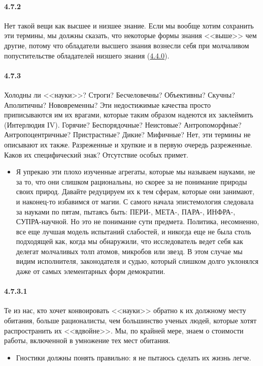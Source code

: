 \paragraph{4.7.2}\hypertarget{par:4.7.2}{} Нет такой вещи как высшее и низшее знание. Если мы вообще хотим сохранить эти термины, мы должны сказать, что некоторые формы знания <<выше>> чем другие, потому что обладатели высшего знания вознесли себя при молчаливом попустительстве обладателей низшего знания (\hyperlink{par:4.4.0}{4.4.0}).


\paragraph{4.7.3}\hypertarget{par:4.7.3}{} Холодны ли <<науки>>? Строги? Бесчеловечны? Объективны? Скучны? Аполитичны? Нововременны? Эти недостижимые качества просто приписываются им их врагами, которые таким образом надеются их заклеймить (Интерлюдия IV). Горячие? Беспорядочные? Неистовые? Антропоморфные? Антропоцентричные? Пристрастные? Дикие? Мифичные? Нет, эти термины не описывают их также. Разреженные и хрупкие и в первую очередь разреженные. Каков их специфический знак? Отсутствие особых примет.
	\begin{itemize}
	\item 
	Я упрекаю эти плохо изученные агрегаты, которые мы называем науками, не за то, что они слишком рациональны, но скорее за не понимание природы своих природ. Давайте редуцируем их к тем сферам, которые они занимают, и наконец-то избавимся от магии. С самого начала эпистемология следовала за науками по пятам, пытаясь быть: ПЕРИ-, МЕТА-, ПАРА-, ИНФРА-, СУПРА-научной. Но это не понимание сути предмета. Политика, несомненно, все еще лучшая модель испытаний слабостей, и никогда еще не была столь подходящей как, когда мы обнаружили, что исследователь ведет себя как делегат молчаливых толп атомов, микробов или звезд. В этом случае мы видим исполнителя, законодателя и судью, который слишком долго уклонялся даже от самых элементарных форм демократии.
	\end{itemize}	

\paragraph{4.7.3.1}\hypertarget{par:4.7.3.1}{} Те из нас, кто хочет конвоировать <<науки>> обратно к их должному месту обитания, больше рационалисты, чем большинство ученых людей, которые хотят распространить их <<вдвойне>>. Мы, по крайней мере, знаем о стоимости работы, включенной в умножение тех мест обитания.
	\begin{itemize}
	\item 
	Гностики должны понять правильно: я не пытаюсь сделать их жизнь легче.
	\end{itemize}	

